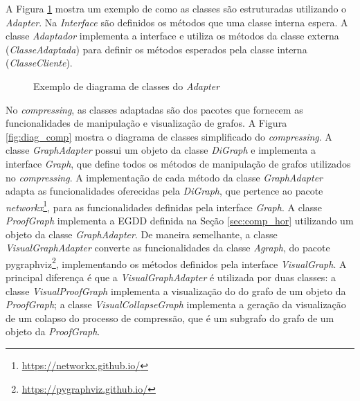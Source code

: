 A Figura \ref{fig:diag_adapter} mostra um exemplo de como as classes são estruturadas utilizando o \textit{Adapter}. Na \textit{Interface} são definidos os métodos que uma classe interna espera. A classe \textit{Adaptador} implementa a interface e utiliza os métodos da classe externa (\textit{ClasseAdaptada}) para definir os métodos esperados pela classe interna (\textit{ClasseCliente}).

\begin{figure}[ht]
  \begin{center}
    \caption{Exemplo de diagrama de classes do \textit{Adapter}}
    \label{fig:diag_adapter}
  \end{center}
\end{figure}

No \textit{compressing}, as classes adaptadas são dos pacotes que fornecem as funcionalidades de manipulação e visualização de grafos. A Figura \ref{fig:diag_comp} mostra o diagrama de classes simplificado do \textit{compressing}. A classe \textit{GraphAdapter} possui um objeto da classe \textit{DiGraph} e implementa a interface \textit{Graph}, que define todos os métodos de manipulação de grafos utilizados no \textit{compressing}. A implementação de cada método da classe \textit{GraphAdapter} adapta as funcionalidades oferecidas pela \textit{DiGraph}, que pertence ao pacote \textit{networkx}\footnote{\href{https://networkx.github.io/}{https://networkx.github.io/}}, para as funcionalidades definidas pela interface \textit{Graph}. A classe \textit{ProofGraph} implementa a EGDD definida na Seção \ref{sec:comp_hor} utilizando um objeto da classe \textit{GraphAdapter}. De maneira semelhante, a classe \textit{VisualGraphAdapter} converte as funcionalidades da classe \textit{Agraph}, do pacote pygraphviz\footnote{\href{https://pygraphviz.github.io/}{https://pygraphviz.github.io/}}, implementando os métodos definidos pela interface \textit{VisualGraph}. A principal diferença é que a \textit{VisualGraphAdapter} é utilizada por duas classes: a classe \textit{VisualProofGraph} implementa a visualização do do grafo de um objeto da \textit{ProofGraph}; a classe \textit{VisualCollapseGraph} implementa a geração da visualização de um colapso do processo de compressão, que é um subgrafo do grafo de um objeto da \textit{ProofGraph}.

